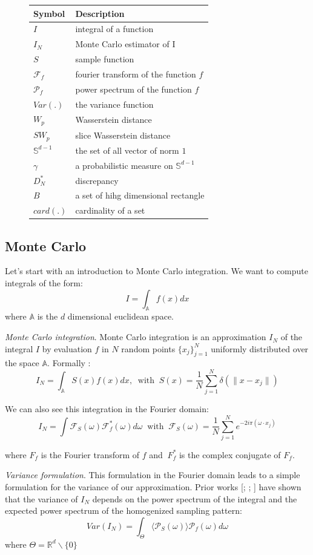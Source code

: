 \documentclass{classeENS}
\begin{document}
\begin{figure}[H]
    \centering
    \begin{tabular}{C{2cm} L{10cm}}
    \hline  
        Symbol & Description
    \tabularnewline 
    \hline
        $I$ & integral of a function
    \tabularnewline
        $I_N$ & Monte Carlo estimator of I
    \tabularnewline
        $S$ & sample function
    \tabularnewline
        $\mathcal F_f$ & fourier transform of the function $f$
    \tabularnewline
        $\mathcal P_f$ & power spectrum of the function $f$
    \tabularnewline
        $Var(.)$ & the variance function
    \tabularnewline
        $W_p$ & Wasserstein distance
    \tabularnewline
        $SW_p$ & slice Wasserstein distance
    \tabularnewline
        $\mathbb S^{d-1}$ & the set of all vector of norm $1$
    \tabularnewline
        $\gamma$ & a probabilistic measure on $\mathbb S^{d-1}$
    \tabularnewline
        $D_N^*$ & discrepancy
    \tabularnewline
        $B$ & a set of hihg dimensional rectangle
    \tabularnewline
        $card(.)$ & cardinality of a set
    \tabularnewline
    \hline 
    \end{tabular}
\end{figure}

\subsection{Monte Carlo}

Let's start with an introduction to Monte Carlo integration. We want to compute integrals of 
the form:
    \[ I = \int_{\mathbb A} f(x) dx\]
where $\mathbb A$ is the $d$ dimensional euclidean space.

\> \textit{Monte Carlo integration}. Monte Carlo integration is an approximation
    $I_N$ of the integral $I$ by evaluation $f$ in $N$ random points $\{x_j\}_{j=1}^N$ uniformly 
    distributed over the space $\mathbb A$. Formally :
    \[ I_N = \int_{\mathbb A} S(x)f(x)dx, 
        \: \text{ with } \:
    S(x) = \frac{1}{N} \sum_{j=1}^N \delta(\lVert x-x_j \rVert) \] 

\noindent We can also see this integration in the Fourier domain:
\[I_N = \int \mathcal F_S(\omega) \mathcal F_f^*(\omega) d\omega 
    \: \text{ with } \:
    \mathcal F_S(\omega) = \frac{1}{N} \sum_{j=1}^N e^{-2i\pi(\omega\cdot x_j)} \]

    \noindent where $F_f$ is the Fourier transform of $f$ and $\ F_f^*$ is the 
    complex conjugate of $F_f$.

\> \textit{Variance formulation}. This formulation in the Fourier domain leads to a simple
    formulation for the variance of our approximation. Prior works  [\cite{Durand2011AFA}; \cite{Pilleboue:2015:VAMCI}; \cite{10.1145/2461912.2462013}] 
    have shown that the variance of $I_N$ depends on the power spectrum of the integral 
    and the expected power spectrum of the homogenized sampling pattern:
    \[ Var(I_N) = \int_\Theta \langle \mathcal P_S(\omega)\rangle \mathcal P_f(\omega) d\omega \]
    \noindent where $\Theta = \mathbb R^d\backslash\{0\} $
\end{document}
